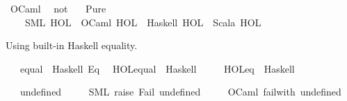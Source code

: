 \begin{isabellebody}
\ OCaml\isanewline
\ \ not\isanewline
\isanewline
{}\isamarkupfalse%
\isanewline
\ \ \ Pure\ {\isasymrightharpoonup}\isanewline
\ \ \ \ {\isacharparenleft}{\kern0pt}SML{\isacharparenright}{\kern0pt}\ HOL\ \ {\isacharparenleft}{\kern0pt}OCaml{\isacharparenright}{\kern0pt}\ HOL\ \ {\isacharparenleft}{\kern0pt}Haskell{\isacharparenright}{\kern0pt}\ HOL\ \ {\isacharparenleft}{\kern0pt}Scala{\isacharparenright}{\kern0pt}\ HOL%
\begin{isamarkuptext}%
Using built-in Haskell equality.%
\end{isamarkuptext}\isamarkuptrue%
\isamarkupfalse%
\isanewline
\ \ \ equal\ {\isasymrightharpoonup}\ {\isacharparenleft}{\kern0pt}Haskell{\isacharparenright}{\kern0pt}\ {\isachardoublequoteopen}Eq{\isachardoublequoteclose}\isanewline
{\isacharbar}{\kern0pt}\ \ HOL{\isachardot}{\kern0pt}equal\ {\isasymrightharpoonup}\ {\isacharparenleft}{\kern0pt}Haskell{\isacharparenright}{\kern0pt}\ \ {}\ {\isachardoublequoteopen}{\isacharequal}{\kern0pt}{\isacharequal}{\kern0pt}{\isachardoublequoteclose}\isanewline
{\isacharbar}{\kern0pt}\ \ HOL{\isachardot}{\kern0pt}eq\ {\isasymrightharpoonup}\ {\isacharparenleft}{\kern0pt}Haskell{\isacharparenright}{\kern0pt}\ \ {}\ {\isachardoublequoteopen}{\isacharequal}{\kern0pt}{\isacharequal}{\kern0pt}{\isachardoublequoteclose}%
\begin{isamarkuptext}%
%
\end{isamarkuptext}\isamarkuptrue%
\isamarkupfalse%
\isanewline
\ \ \ undefined\ {\isasymrightharpoonup}\isanewline
\ \ \ \ {\isacharparenleft}{\kern0pt}SML{\isacharparenright}{\kern0pt}\ {\isachardoublequoteopen}{\isacharbang}{\kern0pt}{\isacharparenleft}{\kern0pt}raise{\isacharslash}{\kern0pt}\ Fail{\isacharslash}{\kern0pt}\ {\isachardoublequote}{\kern0pt}undefined{\isachardoublequote}{\kern0pt}{\isacharparenright}{\kern0pt}{\isachardoublequoteclose}\isanewline
\ \ \ \ \ {\isacharparenleft}{\kern0pt}OCaml{\isacharparenright}{\kern0pt}\ {\isachardoublequoteopen}failwith{\isacharslash}{\kern0pt}\ {\isachardoublequote}{\kern0pt}undefined{\isachardoublequote}{\kern0pt}{\isachardoublequoteclose}\isanewline

\end{isabellebody}
